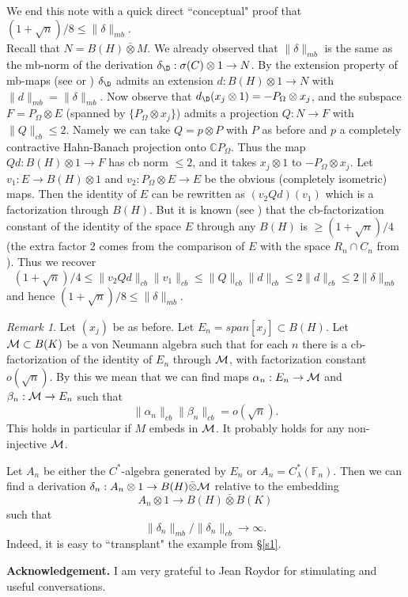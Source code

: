 \documentclass[11pt,leqno]{article}
\newcommand{\n}{\noindent}
\newcommand{\bb}[1]{\mathbb{#1}}
\theoremstyle{plain}
\theoremstyle{definition}
\theoremstyle{remark}
\newtheorem{rem}[thm]{Remark}
\numberwithin{equation}{section}
\def\CC{\bb C}
\def\F{\bb F}
\def\d{\delta}
\def\CC{\bb C}
\def\CC{\bb C}
\def\F{\bb F}
\def\d{\delta}
\def\CC{\bb C}
\def\n{\noindent}
\def\a{\alpha}
\def\a{\alpha}
\begin{document}
    We end this note with a quick direct ``conceptual" proof that $   (1+\sqrt n)/8\le  \|\d\|_{mb}$.\\
     Recall that $N=B(H)\bar\otimes M$.
     We already observed that
     $\|\d\|_{mb}$ is the same as the mb-norm
     of the derivation $\d_\D : \sigma(C)\otimes 1 \to N$.
     By the extension property  of mb-maps (see \cite[p. 266]{100} or  \cite{157})
    $\d_\D$ admits  an extension $d: B(H) \otimes 1 \to N$ with
    $\|d\|_{mb} =  \|\d\|_{mb}$. Now observe that
    $d_\D(x_j \otimes 1) = -P_\Omega \otimes x_j$, and the subspace $F=P_\Omega \otimes E$ (spanned
    by $\{ P_\Omega \otimes x_j\}$) admits a projection $Q: N \to F$
    with $\|Q\|_{cb} \le 2$. Namely
    we can take $Q= p \otimes P$ with $P$ as before
    and $p$ a completely contractive Hahn-Banach projection  onto $\CC P_\Omega $. Thus
    the map $Qd: B(H) \otimes 1 \to F$ has cb norm $\le 2$, and it takes
    $x_j \otimes 1$ to $-P_\Omega \otimes x_j$.
    Let $v_1: E \to B(H) \otimes 1$ 
    and $v_2: P_\Omega \otimes E \to E$ be the obvious (completely isometric) maps.
    Then the identity of $E$ can be rewritten as
    $  (v_2Qd )(v_1)$ which is a factorization through $B(H)$. But it is known (see \cite[Th. 4.1]{HP2}) that the cb-factorization constant
     of the identity of the space $E$
       through any $B(H)$ is $\ge (1+\sqrt n)/4$ (the extra factor 2 comes from the comparison of $E$ with the space $R_n \cap C_n$ from \cite[Th. 4.1]{HP2}). 
     Thus we recover
     $$(1+\sqrt n)/4 \le \|  v_2Qd \|_{cb} \|  v_1 \|_{cb} \le \| Q \|_{cb} \|  d  \|_{cb}\le  2\|  d  \|_{cb}  \le 2\|  \d  \|_{mb} $$ and hence $   (1+\sqrt n)/8\le  \|\d\|_{mb}$.
      \def\b{\beta}
      \def\a{\alpha}
     \def\M{{\cal M}}
          \begin{rem} 
          Let $(x_j)$ be as before. Let $E_n=span[x_j] \subset B(H)$.
          Let $\M\subset B(K)$ be a von Neumann algebra such that
          for each $n$ there is a cb-factorization of the identity of $E_n$          through $\M$,  
           with factorization constant $o(\sqrt n)$. 
           By this we mean that we can find maps $\a_n: E_n \to \M$
            and $\b_n : \M \to E_n$ such that
            $$\|\a_n  \|_{cb}   \| \b_n \|_{cb}   =o(\sqrt n).$$
            This holds in particular if $M$ embeds in $\M$. It probably holds for any non-injective $\M$.
            
        Let $A_n$ be either the $C^*$-algebra generated by $E_n$  or $A_n=C^*_\lambda(\F_n)$.
          Then we can find a derivation
          $\d_n : A_n \otimes 1 \to B(H) \bar\otimes \M $
          relative to the embedding
          $$  A_n \otimes 1 \to B(H) \bar\otimes B(K)$$
          such that
          $${ \|\d_n\|_{mb } / \|\d_n\|_{cb } } \to \infty.$$ 
          Indeed, it is easy to ``transplant" the   example from \S \ref{s1}.
          \end{rem}
       \n\textbf{Acknowledgement.} I am very grateful to Jean Roydor
    for stimulating and useful conversations.
\end{document}

